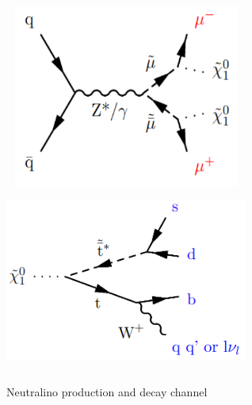 \documentclass{cernatlasnote}
\begin{document}
\begin{figure}[ht]
\centering
\includegraphics[height=6cm, width=8cm, trim= 0cm 0cm 0cm 0.cm,clip]{images/Feynmann/smuprod.png}\includegraphics[height=6cm, width=8cm, trim= 0cm 0cm 0cm 0.cm,clip]{images/Feynmann/ChiDecay.png}
\caption{\label{fig:Feyn} Neutralino production and decay channel}
\end{figure}
\end{document}
